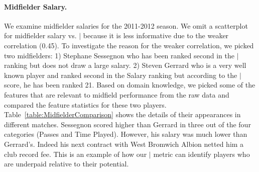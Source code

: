 {\paragraph{Midfielder Salary.} We examine midfielder salaries for the 2011-2012 season.
We omit a scatterplot for midfielder salary vs. $\mid$ because it is less informative due to the weaker  correlation (0.45).
%
To investigate the reason for the weaker correlation, we picked two midfielders: 1) Stephane Sessegnon  who has been ranked second in the $\mid$ ranking but does not draw a large salary.  2) Steven Gerrard who is a very well known player and ranked second in the Salary ranking but according to the $\mid$ score, he has been ranked 21. Based on domain knowledge, we picked some of the features that are relevant to midfield performance from the raw data and compared the feature statistics for these two players. Table~\ref{table:MidfielderComparison} shows the details of their appearances in different matches. Sessegnon scored higher than Gerrard in three out of the four categories (Passes and Time Played). However, his salary was much lower than Gerrard's. Indeed his next contract with West Bromwich Albion netted him a club record fee. This is an example of how our $\mid$ metric can identify players who are underpaid relative to their potential.
		\begin{table}[htbp]
			
			\centering
\end{table}}
